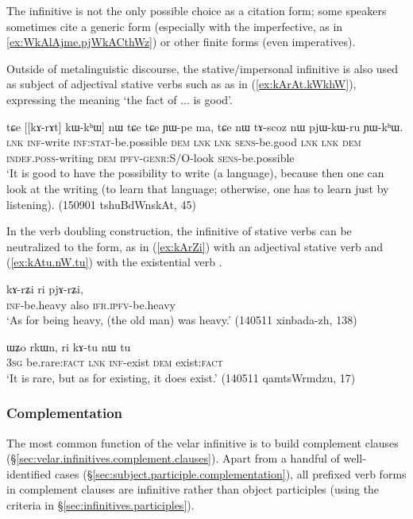 The infinitive is not the only possible choice as a citation form; some speakers sometimes cite a generic form (especially with the imperfective, as  in \ref{ex:WkAlAjme.pjWkACthWz}) or other finite forms (even imperatives).

Outside of metalinguistic discourse, the stative/impersonal infinitive is also used as subject of adjectival stative verbs such as  as in (\ref{ex:kArAt.kWkhW}), expressing the meaning `the fact of ... is good'.

\begin{exe}
\ex \label{ex:kArAt.kWkhW}
 \gll tɕe [[kɤ-rɤt] kɯ-kʰɯ] nɯ tɕe tɕe ɲɯ-pe ma, tɕe nɯ tɤ-scoz nɯ pjɯ-kɯ-ru ɲɯ-kʰɯ. \\
 \textsc{lnk} \textsc{inf}-write \textsc{inf}:\textsc{stat}-be.possible \textsc{dem} \textsc{lnk} \textsc{lnk} \textsc{sens}-be.good \textsc{lnk} \textsc{lnk} \textsc{dem} \textsc{indef}.\textsc{poss}-writing \textsc{dem} \textsc{ipfv}-\textsc{genr}:S/O-look \textsc{sens}-be.possible \\
 \glt `It is good to have the possibility to write (a language), because then one can look at the writing (to learn that language; otherwise, one has to learn just by listening). (150901 tshuBdWnskAt, 45)
\end{exe}

In the verb doubling construction, the infinitive of stative verbs can be neutralized to the  form, as in (\ref{ex:kArZi}) with an adjectival stative verb and (\ref{ex:kAtu.nW.tu}) with the existential verb .

\begin{exe}
\ex \label{ex:kArZi}
 \gll kɤ-rʑi ri pjɤ-rʑi, 	  \\
 \textsc{inf}-be.heavy also \textsc{ifr}.\textsc{ipfv}-be.heavy \\
 \glt `As for being heavy, (the old man) was heavy.'  (140511 xinbada-zh, 138)
\end{exe}

\begin{exe}
\ex \label{ex:kAtu.nW.tu}
 \gll ɯʑo rkɯn, ri kɤ-tu nɯ tu  \\
 \textsc{3sg} be.rare:\textsc{fact} \textsc{lnk} \textsc{inf}-exist \textsc{dem} exist:\textsc{fact} \\
 \glt `It is rare, but as for existing, it does exist.' (140511 qamtsWrmdzu, 17)
\end{exe}

\subsubsection{Complementation}    \label{sec:inf.complementation}
The most common function of the velar infinitive is to build complement clauses (§\ref{sec:velar.infinitives.complement.clauses}). Apart from a handful of well-identified cases (§\ref{sec:subject.participle.complementation}), all  prefixed verb forms in complement clauses are infinitive rather than object participles (using the criteria in §\ref{sec:infinitives.participles}). 

